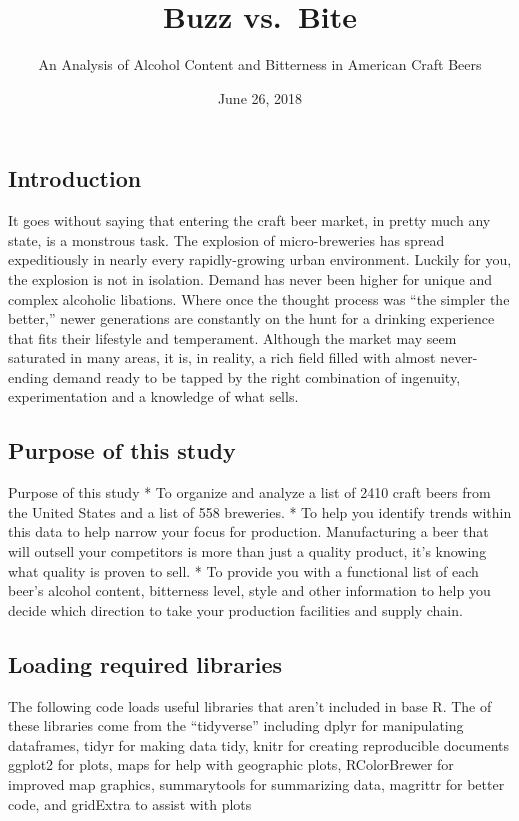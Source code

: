 \documentclass[]{article}
\title{Buzz vs.~Bite}
\subtitle{An Analysis of Alcohol Content and Bitterness in American Craft Beers}
\author{}
\date{June 26, 2018}
\begin{document}
\maketitle

\subsection{Introduction}\label{introduction}

It goes without saying that entering the craft beer market, in pretty
much any state, is a monstrous task. The explosion of micro-breweries
has spread expeditiously in nearly every rapidly-growing urban
environment. Luckily for you, the explosion is not in isolation. Demand
has never been higher for unique and complex alcoholic libations. Where
once the thought process was ``the simpler the better,'' newer
generations are constantly on the hunt for a drinking experience that
fits their lifestyle and temperament. Although the market may seem
saturated in many areas, it is, in reality, a rich field filled with
almost never-ending demand ready to be tapped by the right combination
of ingenuity, experimentation and a knowledge of what sells.

\subsection{Purpose of this study}\label{purpose-of-this-study}

Purpose of this study * To organize and analyze a list of 2410 craft
beers from the United States and a list of 558 breweries. * To help you
identify trends within this data to help narrow your focus for
production. Manufacturing a beer that will outsell your competitors is
more than just a quality product, it's knowing what quality is proven to
sell. * To provide you with a functional list of each beer's alcohol
content, bitterness level, style and other information to help you
decide which direction to take your production facilities and supply
chain.

\subsection{Loading required
libraries}\label{loading-required-libraries}

The following code loads useful libraries that aren't included in base
R. The of these libraries come from the ``tidyverse'' including dplyr
for manipulating dataframes, tidyr for making data tidy, knitr for
creating reproducible documents ggplot2 for plots, maps for help with
geographic plots, RColorBrewer for improved map graphics, summarytools
for summarizing data, magrittr for better code, and gridExtra to assist
with plots
\end{document}
